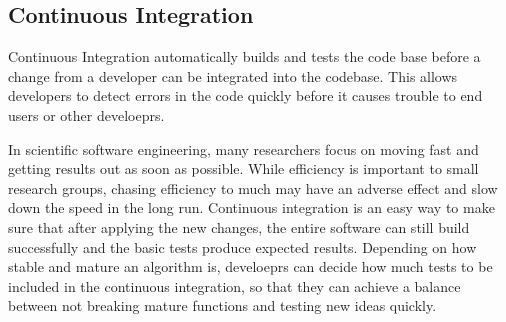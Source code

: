 \subsection{Continuous Integration}
Continuous Integration automatically builds and tests the code base before a change from a developer can be integrated into the codebase.
This allows developers to detect errors in the code quickly before it causes trouble to end users or other develoeprs.

In scientific software engineering, many researchers focus on moving fast and getting results out as soon as possible.
While efficiency is important to small research groups, chasing efficiency to much may have an adverse effect and slow down the speed in the long run.
Continuous integration is an easy way to make sure that after applying the new changes, the entire software can still build successfully and the basic tests produce expected results.
Depending on how stable and mature an algorithm is, develoeprs can decide how much tests to be included in the continuous integration, so that they can achieve a balance between not breaking mature functions and testing new ideas quickly.
